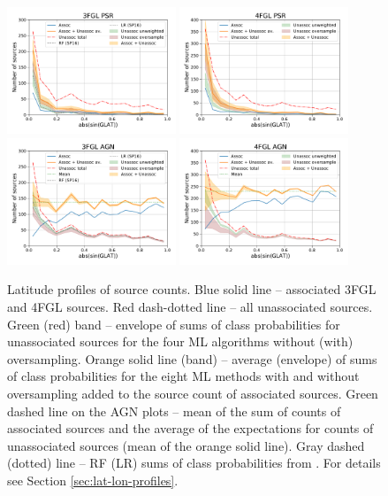 \begin{figure}[h]
\center
\includegraphics[width=0.45\textwidth]{plots/lat_profile_PSR_3FGL_oversample.pdf}
\includegraphics[width=0.45\textwidth]{plots/lat_profile_PSR_4FGL_oversample.pdf} \\
\includegraphics[width=0.45\textwidth]{plots/lat_profile_AGN_3FGL_oversample.pdf}
\includegraphics[width=0.45\textwidth]{plots/lat_profile_AGN_4FGL_oversample.pdf}
\caption{Latitude profiles of source counts. Blue solid line -- associated 3FGL and 4FGL sources. Red dash-dotted line -- all unassociated sources. Green (red) band -- envelope of sums of class probabilities for unassociated sources for the four ML algorithms without (with) oversampling. Orange solid line (band) -- average (envelope) of sums of class probabilities for the eight ML methods with and without oversampling added to the source count of associated sources. 
Green dashed line on the AGN plots -- mean of the sum of counts of associated sources and the average of the expectations for counts of unassociated sources (mean of the orange solid line).
Gray dashed (dotted) line -- RF (LR) sums of class probabilities from \cite{2016ApJ...820....8S}.
For details see Section \ref{sec:lat-lon-profiles}. }  
\label{fig:lat_profile}
\end{figure}
